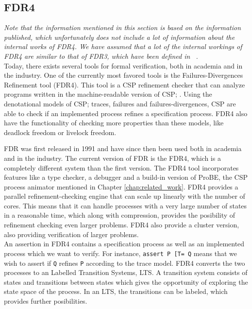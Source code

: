 \subsection{FDR4}
\textit{Note that the information mentioned in this section is based on the information published, which unfortunately does not include a lot of information about the internal works of FDR4. We have assumed that a lot of the internal workings of FDR4 are similar to that of FDR3, which have been defined in ~\cite{fdr}.}\\

Today, there exists several tools for formal verification, both in academia and in the industry. One of the currently most favored tools is the Failures-Divergences Refinement tool (FDR4). This tool is a CSP refinement checker that can analyze programs written in the machine-readable version of CSP; \cspm{}.
Using the denotational models of CSP; traces, failures and failures-divergences, CSP are able to check if an implemented process refines a specification process. FDR4 also have the functionality of checking more properties than these models, like deadlock freedom or livelock freedom.

FDR was first released in 1991 and have since then been used both in academia and in the industry. The current version of FDR is the FDR4, which is a completely different system than the first version.
The FDR4 tool incorporates features like a \cspm{} type checker, a debugger and a build-in version of ProBE, the CSP process animator mentioned in Chapter \ref{chap:related_work}. FDR4 provides a parallel refinement-checking engine that can scale up linearly with the number of cores. This means that it can handle processes with a very large number of states in a reasonable time, which along with compression, provides the posibility of refinement checking even larger problems. FDR4 also provide a cluster version, also providing verification of larger problems.\\

An assertion in FDR4 contains a specification process as well as an implemented process which we want to verify. For instance, \texttt{assert P [T= Q} means that we wish to assert if \texttt{Q} refines \texttt{P} according to the trace model.
FDR4 converts the two processes to an Labelled Transition Systems, LTS. A transition system consists of states and transitions between states which gives the opportunity of exploring the state space of the process. In an LTS, the transitions can be labeled, which provides further posibilities.

